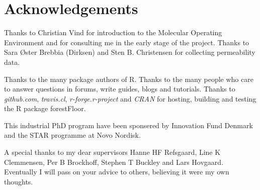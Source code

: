 \chapter{Acknowledgements}
Thanks to Christian Vind for introduction to the Molecular Operating Environment and for consulting me in the early stage of the project. Thanks to Sara Øster Brebbia (Dirksen) and Sten B. Christensen for collecting permeability data.

Thanks to the many package authors of R. Thanks to the many people who care to answer questions in forums, write guides, blogs and tutorials. Thanks to \textit{github.com}, \textit{travis.cl}, \textit{r-forge.r-project} and \textit{CRAN} for hosting, building and testing the R package forestFloor.

This industrial PhD program have been sponsered by Innovation Fund Denmark and the STAR programme at Novo Nordisk.

A special thanks to my dear supervisors Hanne HF Refsgaard, Line K Clemmensen, Per B Brockhoff, Stephen T Buckley and Lars Hovgaard. Eventually I will pass on your advice to others, believing it were my own thoughts.